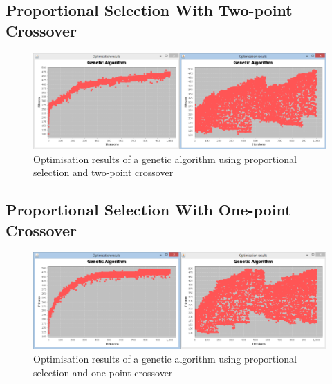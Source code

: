 \begin{landscape}
\subsection{Proportional Selection With Two-point Crossover}
\label{sec:appendix7}
  \begin{figure}[h]
    \begin{center}
      \includegraphics{Figures/ga_fp_2p}
    \end{center}
    \caption{Optimisation results of a genetic algorithm using proportional selection and two-point crossover}
    \label{fig:phase1}
  \end{figure}
\end{landscape}

\begin{landscape}
\subsection{Proportional Selection With One-point Crossover}
\label{sec:appendix8}
  \begin{figure}[h]
    \begin{center}
      \includegraphics{Figures/ga_fp_1p}
    \end{center}
    \caption{Optimisation results of a genetic algorithm using proportional selection and one-point crossover}
    \label{fig:phase1}
  \end{figure}
\end{landscape}

